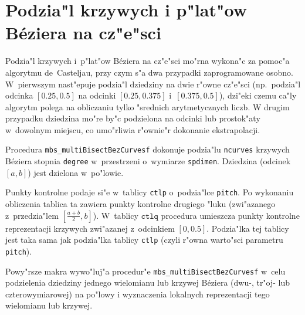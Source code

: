 

\section{Podzia"l krzywych i p"lat"ow B\'{e}ziera na cz"e"sci}

Podzia"l krzywych i~p"lat"ow B\'{e}ziera na cz"e"sci mo"rna wykona"c za
pomoc"a algorytmu de~Casteljau, przy czym s"a dwa przypadki zaprogramowane
osobno. W~pierwszym nast"epuje podzia"l dziedziny na dwie r"owne cz"e"sci
(np.\ podzia"l odcinka $[0.25,0.5]$ na odcinki $[0.25,0.375]$
i~$[0.375,0.5]$), dzi"eki czemu ca"ly algorytm polega na obliczaniu
tylko "srednich arytmetycznych liczb. W drugim przypadku dziedzina mo"re
by"c podzielona na odcinki lub prostok"aty w~dowolnym miejscu, co umo"rliwia
r"ownie"r dokonanie ekstrapolacji.

\vspace{\bigskipamount}
Procedura \texttt{mbs\_multiBisectBezCurvesf} dokonuje podzia"lu
\texttt{ncurves} krzywych B\'{e}ziera stopnia \texttt{degree} w~przestrzeni
o~wymiarze \texttt{spdimen}. Dziedzina (odcinek $[a,b]$) jest dzielona
w~po"lowie.

\begin{sloppypar}
Punkty kontrolne podaje si"e w~tablicy \texttt{ctlp} o~podzia"lce
\texttt{pitch}. Po wykonaniu obliczenia tablica ta zawiera punkty kontrolne
drugiego "luku (zwi"azanego z~przedzia"lem $[\frac{a+b}{2},b]$).
W~tablicy $\texttt{ctlq}$ procedura umieszcza punkty kontrolne reprezentacji
krzywych zwi"azanej z~odcinkiem $[0,0.5]$. Podzia"lka tej tablicy jest taka
sama jak podzia"lka tablicy \texttt{ctlp} (czyli r"owna warto"sci parametru
\texttt{pitch}).
\end{sloppypar}

\vspace{\bigskipamount}
Powy"rsze makra wywo"luj"a procedur"e
\texttt{mbs\_multiBisectBezCurvesf} w~celu podzielenia dziedziny jednego
wielomianu lub krzywej B\'{e}ziera (dwu-, tr"oj- lub czterowymiarowej) na
po"lowy i wyznaczenia lokalnych reprezentacji tego wielomianu lub krzywej.

